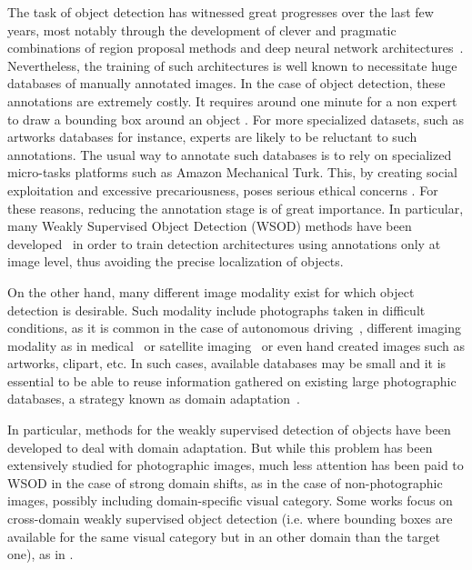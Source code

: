 \documentclass[preprint]{elsarticle}
\begin{document}
The task of object detection has witnessed great progresses over the last few years, most notably through the development of clever and pragmatic combinations of region proposal methods and deep neural network architectures~\cite{ren_faster_2015}. Nevertheless, the training of such architectures is well known to necessitate huge databases of manually annotated images. In the case of object detection, these annotations are extremely costly. It requires around one minute for a non expert to draw a bounding box around an object \cite{su_crowdsourcing_2016}. For more specialized datasets, such as artworks databases for instance, experts are likely to be reluctant to such annotations. The usual way to annotate such databases is to rely on specialized micro-tasks platforms such as Amazon Mechanical Turk. This, by creating social exploitation and excessive precariousness, poses serious ethical concerns \cite{tubaro_microwork_2019}. For these reasons, reducing the annotation stage is of great importance. In particular, many Weakly Supervised Object Detection (WSOD) methods have been developed~\cite{bilen_weakly_2016,zhu_soft_2017,tang_weakly_2018} in order to train detection architectures using annotations only at image level, thus avoiding the precise localization of objects. 

On the other hand, many different image modality exist for which object detection is desirable. Such modality include photographs taken in difficult conditions, as it is common in the case of autonomous driving~\cite{vu_advent_2019}, different imaging modality as in medical~\cite{yang_unsupervised_2019} or satellite imaging~\cite{li_adaptive_2018} or even hand created images such as artworks, clipart, etc. In such cases, available databases may be small and it is essential to be able to reuse information gathered on existing large photographic databases, a strategy known as domain adaptation~\cite{saenko_adapting_2010}. 


In particular, methods for the weakly supervised detection of objects have been developed to deal with domain adaptation. But while this problem has been extensively studied for photographic images, much less attention has been paid to WSOD in the case of strong domain shifts, as in the case of non-photographic images, possibly including domain-specific visual category. Some works focus on cross-domain weakly supervised object detection (i.e. where bounding boxes are available for the same visual category but in an other domain than the target one), as in \cite{inoue_crossdomain_2018,fu_deeply_2020}.
\end{document}
